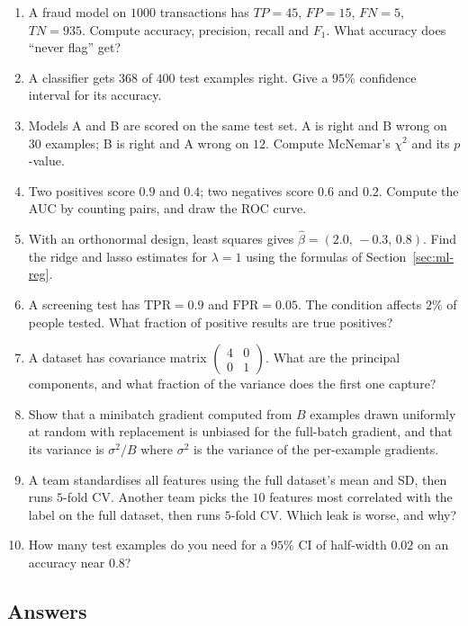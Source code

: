 \begin{enumerate}
  \item A fraud model on $1000$ transactions has $TP=45$, $FP=15$, $FN=5$, $TN=935$. Compute
  accuracy, precision, recall and $F_1$. What accuracy does ``never flag'' get?
  \item A classifier gets $368$ of $400$ test examples right. Give a $95\%$ confidence interval
  for its accuracy.
  \item Models A and B are scored on the same test set. A is right and B wrong on $30$ examples;
  B is right and A wrong on $12$. Compute McNemar's $\chi^2$ and its $p$-value.
  \item Two positives score $0.9$ and $0.4$; two negatives score $0.6$ and $0.2$. Compute the
  AUC by counting pairs, and draw the ROC curve.
  \item With an orthonormal design, least squares gives $\hat\beta=(2.0,\,-0.3,\,0.8)$. Find
  the ridge and lasso estimates for $\lambda=1$ using the formulas of
  Section~\ref{sec:ml-reg}.
  \item A screening test has $\text{TPR}=0.9$ and $\text{FPR}=0.05$. The condition affects $2\%$
  of people tested. What fraction of positive results are true positives?
  \item A dataset has covariance matrix $\begin{pmatrix}4&0\\0&1\end{pmatrix}$. What are the
  principal components, and what fraction of the variance does the first one capture?
  \item Show that a minibatch gradient computed from $B$ examples drawn uniformly at random with
  replacement is unbiased for the full-batch gradient, and that its variance is $\sigma^2/B$
  where $\sigma^2$ is the variance of the per-example gradients.
  \item A team standardises all features using the full dataset's mean and SD, then runs
  $5$-fold CV. Another team picks the $10$ features most correlated with the label on the full
  dataset, then runs $5$-fold CV. Which leak is worse, and why?
  \item How many test examples do you need for a $95\%$ CI of half-width $0.02$ on an accuracy
  near $0.8$?
\end{enumerate}

\subsection*{Answers}

